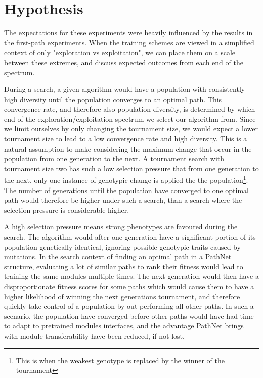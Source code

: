 \section{Hypothesis}
The expectations for these experiments were heavily influenced by the results in the first-path experiments. When the training schemes are viewed in a simplified context of only "exploration vs exploitation", we can place them on a scale between these extremes, and discuss expected outcomes from each end of the spectrum. 

During a search, a given algorithm would have a population with consistently high diversity until the population converges to an optimal path. This convergence rate, and therefore also population diversity, is determined by which end of the exploration/exploitation spectrum we select our algorithm from. Since we limit ourselves by only changing the tournament size, we would expect a lower tournament size to lead to a low convergence rate and high diversity. This is a natural assumption to make considering the maximum change that occur in the population from one generation to the next. A tournament search with tournament size two has such a low selection pressure that from one generation to the next, only one instance of genotypic change is applied the the population\footnote{This is when the weakest genotype is replaced by the winner of the tournament}. The number of generations until the population have converged to one optimal path would therefore be higher under such a search, than a search where the selection pressure is considerable higher. 

A high selection pressure means strong phenotypes are favoured during the search. The algorithm would after one generation have a significant portion of its population genetically identical, ignoring possible genotypic traits caused by mutations. In the search context of finding an optimal path in a PathNet structure, evaluating a lot of similar paths to rank their fitness would lead to training the same modules multiple times. The next generation would then have a disproportionate fitness scores for some paths which would cause them to have a higher likelihood of winning the next generations tournament, and therefore quickly take control of a population by out performing all other paths. In such a scenario, the population have converged before other paths would have had time to adapt to pretrained modules interfaces, and the advantage PathNet brings with module transferability have been reduced, if not lost.  

